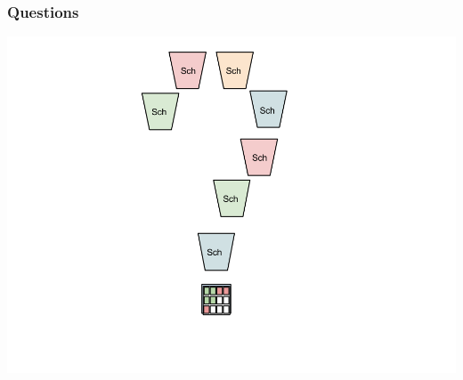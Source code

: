 \documentclass[notes=hide]{beamer}
\begin{document}
  \begin{frame}
    \frametitle{Questions}
    \includegraphics[trim = 0mm 0mm 25mm 0mm,clip,scale=0.35,natwidth=960,natheight=720]{Question.png}
  \end{frame}
\end{document}
